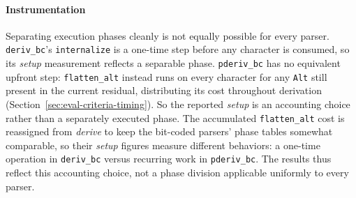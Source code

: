 \paragraph{Instrumentation}
Separating execution phases cleanly is not equally possible
for every parser. 
\texttt{deriv\_bc}'s \texttt{internalize} is a
one-time step before any character is consumed, so its
\emph{setup} measurement reflects a separable phase.
\texttt{pderiv\_bc} has no equivalent upfront step:
\texttt{flatten\_alt} instead runs on every character for any
\texttt{Alt} still present in the current residual, distributing
its cost throughout derivation
(Section~\ref{sec:eval-criteria-timing}).
So the reported \emph{setup} is an accounting choice
rather than a separately executed phase. 
The accumulated \texttt{flatten\_alt} cost is reassigned 
from \emph{derive} to keep the bit-coded parsers' phase tables somewhat comparable,
so their \emph{setup} figures measure different
behaviors: a one-time operation in \texttt{deriv\_bc}
versus recurring work in \texttt{pderiv\_bc}.
The results thus reflect this accounting choice,
not a phase division applicable uniformly to every parser.


